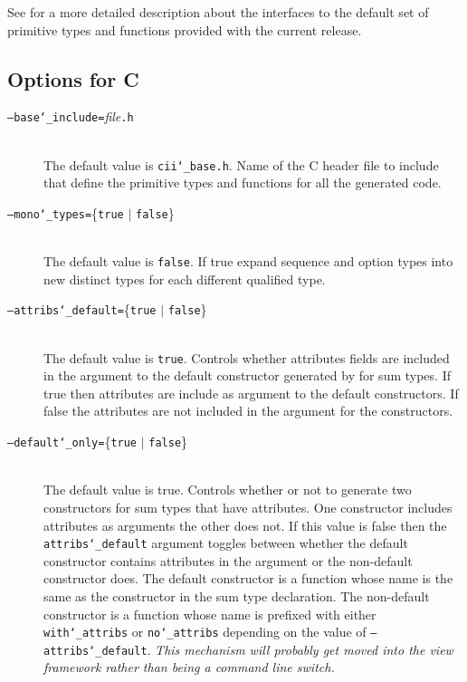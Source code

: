 See  for a more detailed description about the interfaces
to the default set of primitive types and functions provided with the current release.

\subsection{Options for C}
 \begin{description}
   \item[\normalfont\texttt{--base\char`\_include=}\textit{file}\texttt{.h}] \mbox{}\\
     The default value is \texttt{cii\char`\_base.h}. Name of the C header file to
     include that define the primitive types and functions for all the generated
     code. 

   \item[\normalfont\texttt{--mono\char`\_types=}\{\texttt{true} $|$ \texttt{false}\}] \mbox{}\\
     The default value is \texttt{false}. If true expand sequence and option types into
     new distinct types for each different qualified type.  

   \item[\normalfont\texttt{--attribs\char`\_default=}\{\texttt{true} $|$ \texttt{false}\}] \mbox{}\\
     The default value is \texttt{true}. Controls whether attributes fields are included in
     the argument to the default constructor generated by \asdlgen{} for sum
     types. If true then attributes are include as argument to the default
     constructors. If false the attributes are not included in the argument for
     the constructors.

   \item[\normalfont\texttt{--default\char`\_only=}\{\texttt{true} $|$ \texttt{false}\}] \mbox{}\\
     The default value is true. Controls whether or not to generate two
     constructors for sum types that have attributes. One constructor includes
     attributes as arguments the other does not. If this value is false then
     the \texttt{attribs\char`\_default} argument toggles between whether the default
     constructor contains attributes in the argument or the non-default
     constructor does. The default constructor is a function whose name is the
     same as the constructor in the sum type declaration. The non-default
     constructor is a function whose name is prefixed with either
     \texttt{with\char`\_attribs} or \texttt{no\char`\_attribs} depending on the value of
     \texttt{--attribs\char`\_default}.
     \textit{This mechanism will probably get moved
     into the view framework rather than being a command line switch.}
\end{description}%

